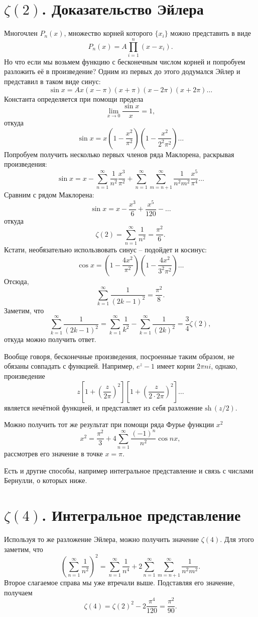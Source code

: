 \documentclass{ncc}
\begin{document}
\section{\( \zeta(2) \). Доказательство Эйлера}
Многочлен \( P_n(x) \), множество корней которого \( \{ x_i \} \) можно представить в виде
\[
    P_n(x) = A\prod\limits_{i=1}^n (x-x_i).
\]
Но что если мы возьмем функцию с бесконечным числом корней и попробуем разложить её в произведение? Одним из первых до этого додумался Эйлер и представил в таком виде синус:
\[
    \sin x = Ax(x-\pi)(x+\pi)(x-2\pi)(x+2\pi)\ldots
\]
Константа определяется при помощи предела
\[
    \lim_{x\to0} \frac{\sin x}{x} = 1,
\]
откуда
\[
    \sin{x} = x\left(1-\frac{x^2}{\pi^2}\right)\left(1-\frac{x^2}{2^2\pi^2}\right)\ldots
\]
Попробуем получить несколько первых членов ряда Маклорена, раскрывая произведения:
\[
    \sin{x} = x - \sum\limits_{n=1}^\infty\frac{1}{n^2}\frac{x^3}{\pi^2} + \sum\limits_{n=1}^\infty\sum\limits_{m=n+1}^\infty\frac{1}{n^2m^2}\frac{x^5}{\pi^4} \ldots
\]
Сравним с рядом Маклорена:
\[
    \sin x = x - \frac{x^3}{6} + \frac{x^5}{120} - \ldots
\]
откуда
\[
    \zeta(2) = \sum\limits_{n=1}^\infty\frac{1}{n^2} = \frac{\pi^2}{6}.
\]
Кстати, необязательно использвовать синус -- подойдет и косинус:
\[
    \cos x = \left(1 - \frac{4x^2}{\pi^2}\right)\left(1 - \frac{4x^2}{3^2\pi^2}\right)\ldots
\]
Отсюда,
\[
    \sum\limits_{k=1}^\infty \frac{1}{(2k-1)^2} = \frac{\pi^2}{8}.
\]
Заметим, что
\[
    \sum\limits_{k=1}^\infty \frac{1}{(2k-1)^2} = \sum\limits_{k=1}^\infty \frac{1}{k^2} - \sum\limits_{k=1}^\infty \frac{1}{(2k)^2} = \frac{3}{4}\zeta(2),
\]
откуда можно получить ответ.

Вообще говоря, бесконечные произведения, посроенные таким образом, не обязаны совпадать с функцией. Например, \( e^z - 1 \) имеет корни \( 2\pi n i \), однако, произведение 
\[
    z\left[1+\left(\frac{z}{2\pi}\right)^2\right]\left[1+\left(\frac{z}{2\cdot2\pi}\right)^2\right]\ldots
\]
является нечётной функцией, и представляет из себя разложение \( \mathrm{sh\,}(z/2) \).

Можно получить тот же результат при помощи ряда Фурье функции \( x^2 \)
\[
    x^2 = \frac{\pi^2}{3} + 4\sum\limits_{n=1}^\infty\frac{(-1)^n}{n^2}\cos nx,
\]
рассмотрев его значение в точке \( x = \pi \).

Есть и другие способы, например интегральное представление и связь с числами Бернулли, о которых ниже.

\section{\(\zeta(4)\). Интегральное представление}
Используя то же разложение Эйлера, можно получить значение \( \zeta(4) \). Для этого заметим, что
\[
    \left(\sum\limits_{n=1}^\infty\frac{1}{n^2}\right)^2 = \sum\limits_{n=1}^\infty\frac{1}{n^4} + 2\sum\limits_{n=1}^\infty\sum\limits_{m=n+1}^\infty\frac{1}{n^2m^2}.
\]
Второе слагаемое справа мы уже втречали выше. Подставляя его значение, получаем
\[
    \zeta(4) = \zeta(2)^2 - 2\frac{\pi^4}{120} = \frac{\pi^2}{90}.
\]
\end{document}
